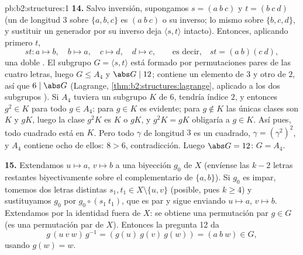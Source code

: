 \begin{solution}{pb:b2:structures:1}
\textbf{14.} Salvo inversión, supongamos $s = (a\ b\ c)$ y $t = (b\
c\ d)$ (un  de longitud $3$ sobre $\{a,b,c\}$ es $(a\ b\ c)$ o
su inverso; lo mismo sobre $\{b,c,d\}$, y sustituir un generador
por su inverso deja $\langle s, t\rangle$ intacto). Entonces,
aplicando primero $t$,
\[
st \colon a \mapsto b,\quad b \mapsto a,\quad c \mapsto d,\quad
d \mapsto c, \qquad\text{es decir,}\quad st = (a\ b)(c\ d),
\]
una doble . El subgrupo $G = \langle s, t\rangle$
está formado por permutaciones pares de las cuatro letras, luego $G
\leq A_4$ y $\abs G \mid 12$; contiene un elemento de  $3$ y
otro de \omterm{def:b2:structures:generated}{orden} $2$, así que $6 \mid \abs G$ (Lagrange,
\cref{thm:b2:structures:lagrange}, aplicado a los dos subgrupos
). Si $A_4$ tuviera un subgrupo $K$ de  $6$, tendría
índice $2$, y entonces $g^2 \in K$ para todo $g \in A_4$: para $g
\in K$ es evidente; para $g \notin K$ las únicas clases son $K$ y
$gK$, luego la clase $g^2K$ es $K$ o $gK$, y $g^2K = gK$ obligaría
a $g \in K$. Así pues, todo cuadrado está en $K$. Pero todo 
$\gamma$ de longitud $3$ es un cuadrado, $\gamma = (\gamma^2)^2$, y
$A_4$ contiene ocho de ellos: $8 > 6$, contradicción. Luego $\abs G
= 12$: $G = A_4$.

\textbf{15.} Extendamos $u \mapsto a$, $v \mapsto b$ a una
biyección $g_0$ de $X$ (envíense las $k - 2$ letras restantes
biyectivamente sobre el complementario de $\{a, b\}$). Si $g_0$ es
impar, tomemos dos letras distintas $s_1, t_1 \in X \setminus \{u,
v\}$ (posible, pues $k \geq 4$) y sustituyamos $g_0$ por $g_0 \circ
(s_1\ t_1)$, que es par y sigue enviando $u \mapsto a$, $v \mapsto
b$. Extendamos por la identidad fuera de $X$: se obtiene una
permutación par $g \in G$ (es una permutación par de $X$). Entonces
la pregunta 12 da
\[
g\,(u\ v\ w)\,g^{-1} = (g(u)\ g(v)\ g(w)) = (a\ b\ w) \in G,
\]
usando $g(w) = w$.


\end{solution}
